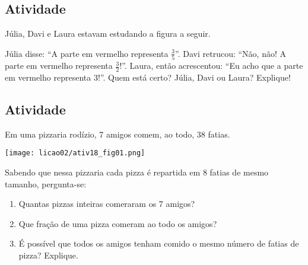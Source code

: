 \subsection{Atividade}

Júlia, Davi e Laura estavam estudando a figura a seguir.
\begin{center}
\end{center}
Júlia disse: ``A parte em vermelho representa $\frac{3}{5}$''. Davi retrucou: ``Não, não! A parte em vermelho representa $\frac{3}{2}$!''. Laura, então acrescentou: ``Eu acho que a parte em vermelho representa $3$!''. Quem está certo? Júlia, Davi ou Laura? Explique!

\subsection{Atividade}

Em uma pizzaria rodízio, 7 amigos comem, ao todo, 38 fatias.

\begin{center}
\texttt{[image: licao02/ativ18\_fig01.png]}
\end{center}


Sabendo que nessa pizzaria cada pizza é repartida em 8 fatias de mesmo tamanho, pergunta-se:
\begin{enumerate} [\quad a)] %
  \item     Quantas pizzas inteiras comeraram os 7 amigos?
  \item     Que fração de uma pizza comeram  ao todo os amigos?
  \item     É possível que todos os amigos tenham comido o mesmo número de fatias de pizza? Explique.
\end{enumerate} %
